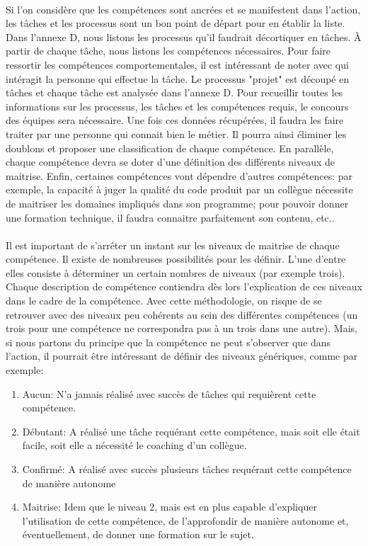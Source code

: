 \paragraph{}Si l'on considère que les compétences sont ancrées et se manifestent dans l'action, les tâches et les processus sont un bon point de départ pour en établir la liste.  Dans l'annexe D, nous listons les processus qu'il faudrait décortiquer en tâches. À partir de chaque tâche, nous listons les compétences nécessaires. Pour faire ressortir les compétences comportementales, il est intéressant de noter avec qui intéragit la personne qui effectue la tâche\citep[pp. 185]{refcompetence}. Le processus "projet" est découpé en tâches et chaque tâche est analysée dans l'annexe D. Pour recueillir toutes les informations sur les processus, les tâches et les compétences requis, le concours des équipes sera nécessaire. Une fois ces données récupérées, il faudra les faire traiter par une personne qui connait bien le métier. Il pourra ainsi éliminer les doublons et proposer une classification de chaque compétence. En parallèle, chaque compétence devra se doter d'une définition des différents niveaux de maitrise. Enfin, certaines compétences vont dépendre d'autres compétences: par exemple, la capacité à juger la qualité du code produit par un collègue nécessite de maitriser les domaines impliqués dans son programme; pour pouvoir donner une formation technique, il faudra connaitre parfaitement son contenu, etc.. 

\paragraph{} Il est important de s'arrêter un instant sur les niveaux de maitrise de chaque compétence. Il existe de nombreuses possibilités pour les définir. L'une d'entre elles consiste à déterminer un certain nombres de niveaux (par exemple trois). Chaque description de compétence contiendra dès lors l'explication de ces niveaux dans le cadre de la compétence. Avec cette méthodologie, on risque de se retrouver avec des niveaux peu cohérents au sein des différentes compétences (un trois pour une compétence ne correspondra pas à un trois dans une autre). Mais, si nous partons du principe que la compétence ne peut s'observer que dans l'action, il pourrait être intéressant de définir des niveaux génériques, comme par exemple: 
\begin{enumerate}
  \item Aucun: N'a jamais réalisé avec succès de tâches qui requièrent cette compétence.
  \item Débutant: A réalisé une tâche requérant cette compétence, mais soit elle était facile, soit elle a nécessité le coaching d'un collègue. 
  \item Confirmé: A réalisé avec succès plusieurs tâches requérant cette compétence de manière autonome
  \item Maitrise: Idem que le niveau 2, mais est en plus capable d'expliquer l'utilisation de cette compétence, de l'approfondir de manière autonome et, éventuellement, de donner une formation sur le sujet.
\end{enumerate}
